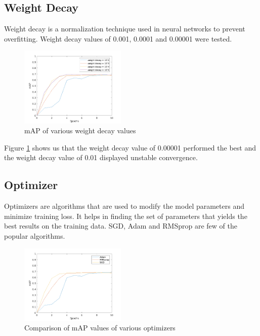 \documentclass[10pt,twocolumn,letterpaper]{article}
\begin{document}
\subsection{Weight Decay}

Weight decay is a normalization technique used in neural networks to prevent overfitting. Weight decay values of
0.001, 0.0001 and 0.00001 were tested.

\begin{figure}[H]
  \begin{center}
    \includegraphics[width=0.45\textwidth]{./assets/weight_decay.png}
    \captionsetup{justification=centering}
    \caption{mAP of various weight decay values}
    \label{fig:weight_decay_comparison}
  \end{center}
\end{figure}

Figure \ref{fig:weight_decay_comparison} shows us that the weight decay value of 0.00001 performed the best and the
weight decay value of 0.01 displayed unstable convergence.

\subsection{Optimizer}

Optimizers are algorithms that are used to modify the model parameters and minimize training loss. It helps in finding
the set of parameters that yields the best results on the training data. SGD, Adam and RMSprop are few of the popular
algorithms.

\begin{figure}[htbp]
  \begin{center}
    \includegraphics[width=0.45\textwidth]{./assets/optimizer_comparison.png}
    \captionsetup{justification=centering}
    \caption{Comparison of mAP values of various optimizers}
    \label{fig:optimizer_comparison}
  \end{center}
\end{figure}
\end{document}
